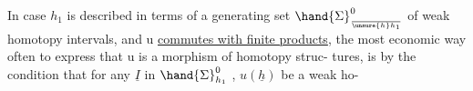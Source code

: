 In case $h_1$ is described in terms of a generating set $\hand{\Sigma}^{0}_{\over{\unsure{h}}{h}_1}$  of weak
homotopy intervals,  and  u \uline{commutes with finite products},  the 
most economic way often to express that u is a morphism of homotopy struc-%
tures,  is by the condition that  for any $\underline{I}$ in $\hand{\Sigma}^{0}_{h_1}$ ,  $u(\underline{h})$ be a weak ho-%

